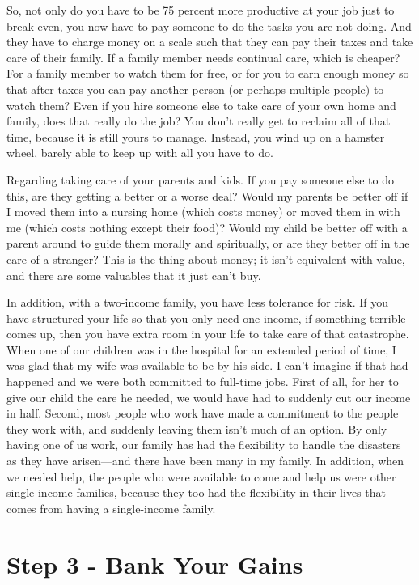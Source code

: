 So, not only do you have to be 75 percent more productive at your job
just to break even, you now have to pay someone to do the tasks you are
not doing. And they have to charge money on a scale such that they can
pay their taxes and take care of their family. If a family member needs
continual care, which is cheaper? For a family member to watch them for
free, or for you to earn enough money so that after taxes you can pay
another person (or perhaps multiple people) to watch them?  Even if you
hire someone else to take care of your own home and family, does that
really do the job?  You don’t really get to reclaim all of that time,
because it is still yours to manage. Instead, you wind up on a hamster
wheel, barely able to keep up with all you have to do.

Regarding taking care
of your parents and kids. If you pay someone else to do this, are they
getting a better or a worse deal?  Would my parents be better off if I
moved them into a nursing home (which costs money) or moved them in
with me (which costs nothing except their food)?  Would my child be
better off with a parent around to guide them morally and spiritually,
or are they better off in the care of a stranger?  This is the thing
about money; it isn’t equivalent with value, and there are some
valuables that it just can’t buy.

In addition, with a two-income family, you have less tolerance for risk.
If you have structured your life so that you only need one income, if
something terrible comes up, then you have extra room in your life to
take care of that catastrophe. When one of our children was in the
hospital for an extended period of time, I was glad that my wife was
available to be by his side. I can’t imagine if that had happened and
we were both committed to full-time jobs. First of all, for her to give
our child the care he needed, we would have had to suddenly cut our
income in half. Second, most people who work have made a commitment to
the people they work with, and suddenly leaving them isn’t much of an
option. By only having one of us work, our family has had the
flexibility to handle the disasters as they have arisen—and there have
been many in my family. In addition, when we needed help, the people
who were available to come and help us were other single-income
families, because they too had the flexibility in their lives that
comes from having a single-income family.

\section{Step 3 - Bank Your Gains}


